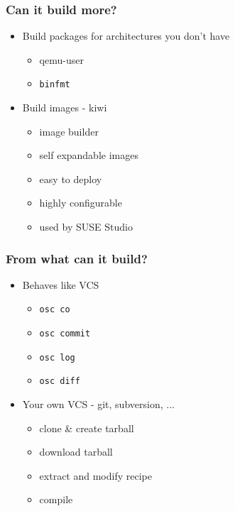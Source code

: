 \begin{frame}[t]
   \frametitle{Can it build more?}
   \begin{itemize}
      \item Build packages for architectures you don't have
      \begin{itemize}
         \item qemu-user
         \item \texttt{binfmt}
      \end{itemize}
      \item Build images - kiwi
      \begin{itemize}
         \item image builder
         \item self expandable images
         \item easy to deploy
         \item highly configurable
         \item used by SUSE Studio
      \end{itemize}
   \end{itemize}
\end{frame}

\begin{frame}[t]
   \frametitle{From what can it build?}
   \begin{itemize}
      \item Behaves like VCS
      \begin{itemize}
         \item \texttt{osc co}
         \item \texttt{osc commit}
         \item \texttt{osc log}
         \item \texttt{osc diff}
      \end{itemize}
      \item Your own VCS - git, subversion, ...
      \begin{itemize}
         \item clone \& create tarball
         \item download tarball
         \item extract and modify recipe
         \item compile
      \end{itemize}
   \end{itemize}
\end{frame}

